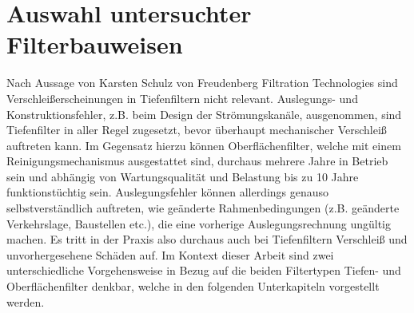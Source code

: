 \chapter{Auswahl untersuchter Filterbauweisen}
\label{ch:auswahl}
Nach Aussage von Karsten Schulz von Freudenberg Filtration Technologies sind Verschleißerscheinungen in Tiefenfiltern nicht relevant. Auslegungs- und Konstruktionsfehler, z.B. beim Design der Strömungskanäle, ausgenommen, sind Tiefenfilter in aller Regel zugesetzt, bevor überhaupt mechanischer Verschleiß auftreten kann.
Im Gegensatz hierzu können Oberflächenfilter, welche mit einem Reinigungsmechanismus ausgestattet sind, durchaus mehrere Jahre in Betrieb sein und abhängig von Wartungsqualität und Belastung bis zu 10 Jahre funktionstüchtig sein. \cite{Schulz} 
Auslegungsfehler können allerdings genauso selbstverständlich auftreten, wie geänderte Rahmenbedingungen (z.B. geänderte Verkehrslage, Baustellen etc.), die eine vorherige Auslegungsrechnung ungültig machen. Es tritt in der Praxis also durchaus auch bei Tiefenfiltern Verschleiß und unvorhergesehene Schäden auf.\newline
Im Kontext dieser Arbeit sind zwei unterschiedliche Vorgehensweise in Bezug auf die beiden Filtertypen Tiefen- und Oberflächenfilter denkbar, welche in den folgenden Unterkapiteln vorgestellt werden.
